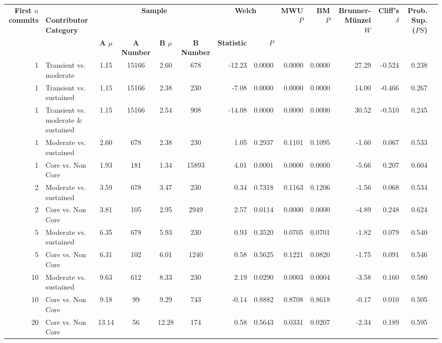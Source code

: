 \begin{landscape}
\begin{table}[H]
\begin{tabular}{r p{4cm} c c c c r r r r r r r r}
\toprule
\makecell[t]{\textbf{First $n$}\\\textbf{commits}} & \makecell[t]{\textbf{}\\\textbf{Contributor}\\\textbf{Category}} & \multicolumn{4}{c}{\textbf{Sample}} & \multicolumn{2}{c}{\textbf{Welch}} & \textbf{MWU $P$} & \textbf{BM $P$} & \makecell[t]{\textbf{}\\\textbf{Brunner-Münzel}\\\textbf{$W$}} & \makecell[t]{\textbf{Cliff's}\\\textbf{$\delta$}} & \makecell[t]{\textbf{Prob. Sup.}\\\textbf{($PS$)}} \\ 
\cmidrule(lr){3-6} \cmidrule(lr){7-8}
 &  & \textbf{A $\mu$} & \textbf{A Number} & \textbf{B $\mu$} & \textbf{B Number} & \textbf{Statistic} & \textbf{$P$} &  &  &  &  &  \\ 
\midrule
1 & Transient vs. moderate &  1.15 & 15166 & 2.60 & 678 & -12.23 & 0.0000 & 0.0000 & 0.0000 & 27.29 & -0.524 & 0.238 \\ 
1 & Transient vs. sustained &  1.15 & 15166 & 2.38 & 230 & -7.08 & 0.0000 & 0.0000 & 0.0000 & 14.00 & -0.466 & 0.267 \\ 
1 & Transient vs. moderate \& sustained &  1.15 & 15166 & 2.54 & 908 & -14.08 & 0.0000 & 0.0000 & 0.0000 & 30.52 & -0.510 & 0.245 \\ 
1 & Moderate vs. sustained &  2.60 & 678 & 2.38 & 230 & 1.05 & 0.2937 & 0.1101 & 0.1095 & -1.60 & 0.067 & 0.533 \\ 
1 & Core vs. Non Core &  1.93 & 181 & 1.34 & 15893 & 4.01 & 0.0001 & 0.0000 & 0.0000 & -5.66 & 0.207 & 0.604 \\ 
2 & Moderate vs. sustained &  3.59 & 678 & 3.47 & 230 & 0.34 & 0.7318 & 0.1163 & 0.1206 & -1.56 & 0.068 & 0.534 \\ 
2 & Core vs. Non Core &  3.81 & 105 & 2.95 & 2949 & 2.57 & 0.0114 & 0.0000 & 0.0000 & -4.89 & 0.248 & 0.624 \\ 
5 & Moderate vs. sustained &  6.35 & 678 & 5.93 & 230 & 0.93 & 0.3520 & 0.0705 & 0.0701 & -1.82 & 0.079 & 0.540 \\ 
5 & Core vs. Non Core &  6.31 & 102 & 6.01 & 1240 & 0.58 & 0.5625 & 0.1221 & 0.0820 & -1.75 & 0.091 & 0.546 \\ 
10 & Moderate vs. sustained &  9.63 & 612 & 8.33 & 230 & 2.19 & 0.0290 & 0.0003 & 0.0004 & -3.58 & 0.160 & 0.580 \\ 
10 & Core vs. Non Core &  9.18 & 99 & 9.29 & 743 & -0.14 & 0.8882 & 0.8708 & 0.8618 & -0.17 & 0.010 & 0.505 \\ 
20 & Core vs. Non Core &  13.14 & 56 & 12.28 & 174 & 0.58 & 0.5643 & 0.0331 & 0.0207 & -2.34 & 0.189 & 0.595 \\ 
\bottomrule
\end{tabular}%
\label{tab:codebase_graph_latex_repository_graph_component_time_series_statistical_significance_test_packages} 
\end{table}
\end{landscape}
\newpage 
